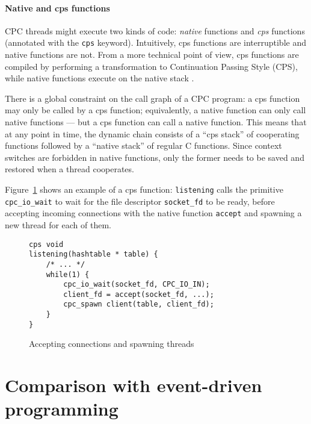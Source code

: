 \documentclass{easychair}
\begin{document}
\paragraph{Native and cps functions}
CPC threads might execute two kinds of code: \emph{native} functions
and \emph{cps} functions (annotated with the \texttt{cps} keyword).
Intuitively, cps functions are interruptible and native functions are not.
From a more technical point of view, cps functions are compiled by
performing a transformation to Continuation Passing Style (CPS), while
native functions execute on the native stack \cite{cpc2010}.

There is a global constraint on the call graph of a CPC program: a cps
function may only be called by a cps function; equivalently, a native
function can only call native functions --- but a cps function can call
a native function.  This means that at any point in time, the dynamic
chain consists of a ``cps stack'' of cooperating functions followed by a
``native stack'' of regular C functions.  Since context switches are
forbidden in native functions, only the former needs to be saved and
restored when a thread cooperates.

Figure~\ref{fig:listening} shows an example of a cps function:
\texttt{listening} calls the primitive \texttt{cpc\_io\_wait} to wait
for the file descriptor \texttt{socket\_fd} to be ready, before
accepting incoming connections with the native function \texttt{accept}
and spawning a new thread for each of them.

\begin{figure}
\begin{center}
\begin{minipage}{0.5\linewidth}
\small
\begin{verbatim}
cps void
listening(hashtable * table) {
    /* ... */
    while(1) {
        cpc_io_wait(socket_fd, CPC_IO_IN);
        client_fd = accept(socket_fd, ...);
        cpc_spawn client(table, client_fd);
    }
}
\end{verbatim}
\end{minipage}
\end{center}
\caption{Accepting connections and spawning threads}
\label{fig:listening}
\end{figure}

\section{Comparison with event-driven programming}
\label{sec:comparison}
\end{document}

